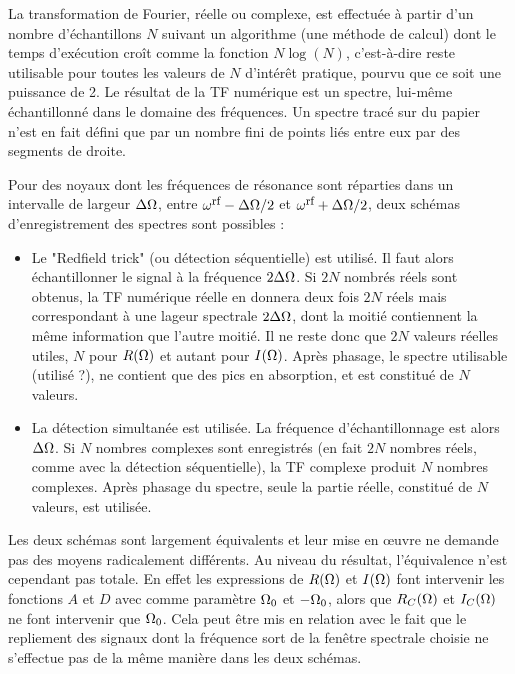 La transformation de Fourier, réelle ou complexe, est effectuée à partir
d'un nombre d'échantillons $N$ suivant un algorithme (une méthode de calcul)
dont le temps d'exécution croît comme la fonction $N\log(N)$, c'est-à-dire
reste utilisable pour toutes les valeurs de $N$ d'intérêt pratique,
pourvu que ce soit une puissance de 2.
Le résultat de la TF numérique est un spectre, lui-même
échantillonné dans le domaine des fréquences.
Un spectre tracé sur du papier n'est en fait défini que par un
nombre fini de points liés entre eux par des segments
de droite.

Pour des noyaux dont les fréquences de résonance sont réparties dans un intervalle
de largeur $\Delta\Omega$, entre $\omega^{\mbox{\footnotesize{rf}}}-\Delta\Omega/2$ et $\omega^{\mbox{\footnotesize{rf}}}+\Delta\Omega/2$,
deux schémas d'enregistrement des spectres sont possibles :
\begin{itemize}
\item
Le "Redfield trick" (ou détection séquentielle) est utilisé. 
Il faut alors échantillonner le signal à la fréquence $2\Delta\Omega$. 
Si $2N$ nombrés réels sont obtenus, la TF numérique réelle en donnera
deux fois $2N$ réels mais correspondant à une lageur spectrale
$2\Delta\Omega$, dont la moitié contiennent la même
information que l'autre moitié.
Il ne reste donc que $2N$ valeurs réelles utiles, $N$ pour $R(\Omega)$
et autant pour $I(\Omega)$.
Après phasage, le spectre utilisable (utilisé ?), ne contient que
des pics en absorption, et est constitué de $N$ valeurs.
\item
La détection simultanée est utilisée. 
La fréquence d'échantillonnage est alors $\Delta\Omega$. 
Si $N$ nombres complexes sont enregistrés (en fait $2N$ nombres réels, 
comme avec la détection séquentielle), la TF complexe produit $N$ nombres
complexes.
Après phasage du spectre, seule la partie réelle, constitué de $N$ valeurs,
est utilisée.
\end{itemize}

Les deux schémas sont largement équivalents et leur mise en {\oe}uvre
ne demande pas des moyens radicalement différents.
Au niveau du résultat, l'équivalence n'est cependant pas totale.
En effet les expressions de $R(\Omega)$ et $I(\Omega)$ font intervenir
les fonctions $A$ et $D$ avec comme paramètre $\Omega_0$ et $-\Omega_0$,
alors que $R_C(\Omega)$ et $I_C(\Omega)$ ne font intervenir que $\Omega_0$.
Cela peut être mis en relation avec le fait que le repliement des signaux
dont la fréquence sort de la fenêtre spectrale choisie ne s'effectue
pas de la même manière dans les deux schémas.

